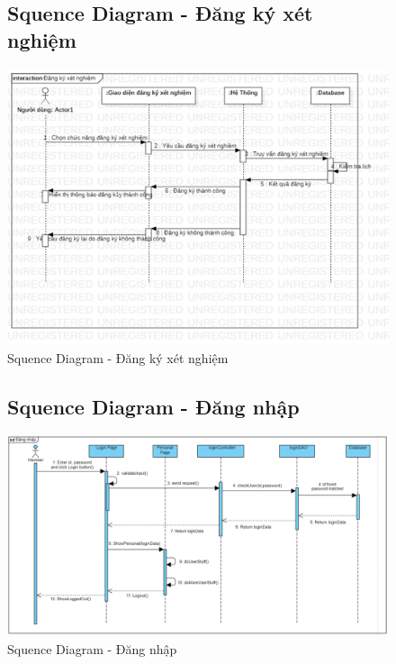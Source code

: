 \documentclass{report}
\begin{document}
\pagebreak
\begin{center}
	\begin{figure}[!htp]
		\subsection{Squence Diagram - Đăng ký xét nghiệm}
		\begin{center}
			\includegraphics[scale=1]{Hinh/Sequence diagram Đăng ký xét nghiệm.png}
		\end{center}
		\caption{Squence Diagram - Đăng ký xét nghiệm}
	\end{figure}
\end{center}

\begin{center}
	\begin{figure}[!htp]
		\subsection{Squence Diagram - Đăng nhập}
		\begin{center}
			\includegraphics[scale=.45]{Hinh/Sequence diagram Đăng nhập.png}
		\end{center}
		\caption{Squence Diagram - Đăng nhập}
	\end{figure}
\end{center}
\end{document}
